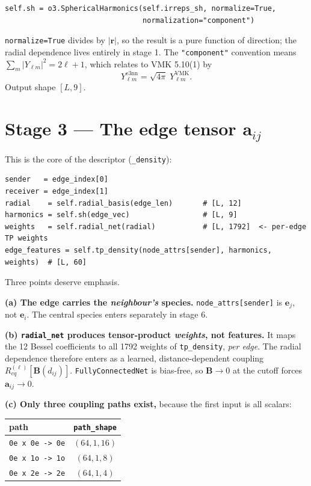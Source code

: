 \documentclass[11pt,a4paper]{article}
\newcommand{\code}[1]{\texttt{\small #1}}
\begin{document}
\begin{lstlisting}
self.sh = o3.SphericalHarmonics(self.irreps_sh, normalize=True,
                                normalization="component")
\end{lstlisting}

\code{normalize=True} divides by $|\bm r|$, so the result is a pure function of
direction; the radial dependence lives entirely in stage 1. The
\code{"component"} convention means $\sum_m |Y_{\ell m}|^2 = 2\ell+1$, which
relates to VMK 5.10(1) by
\begin{equation}
Y^{\text{e3nn}}_{\ell m} = \sqrt{4\pi}\; Y^{\text{VMK}}_{\ell m}.
\end{equation}
Output shape $[L,9]$.

\section{Stage 3 --- The edge tensor \texorpdfstring{$\bm a_{ij}$}{a\_ij}}

This is the core of the descriptor (\code{\_density}):

\begin{lstlisting}
sender   = edge_index[0]
receiver = edge_index[1]
radial    = self.radial_basis(edge_len)       # [L, 12]
harmonics = self.sh(edge_vec)                 # [L, 9]
weights   = self.radial_net(radial)           # [L, 1792]  <- per-edge TP weights
edge_features = self.tp_density(node_attrs[sender], harmonics, weights)  # [L, 60]
\end{lstlisting}

Three points deserve emphasis.

\textbf{(a) The edge carries the \emph{neighbour's} species.}
\code{node\_attrs[sender]} is $\bm e_j$, not $\bm e_i$. The central species enters
separately in stage 6.

\textbf{(b) \code{radial\_net} produces tensor-product \emph{weights}, not features.}
It maps the 12 Bessel coefficients to all 1792 weights of \code{tp\_density},
\emph{per edge}. The radial dependence therefore enters as a learned,
distance-dependent coupling $R^{(\ell)}_{cq}[\bm B(d_{ij})]$. \code{FullyConnectedNet}
is bias-free, so $\bm B \to 0$ at the cutoff forces $\bm a_{ij}\to0$.

\textbf{(c) Only three coupling paths exist,} because the first input is all scalars:

\begin{center}\small
\begin{tabular}{@{}lc@{}}
\toprule
path & \code{path\_shape} \\
\midrule
\code{0e x 0e -> 0e} & $(64,1,16)$ \\
\code{0e x 1o -> 1o} & $(64,1,8)$ \\
\code{0e x 2e -> 2e} & $(64,1,4)$ \\
\bottomrule
\end{tabular}
\end{center}
\end{document}
